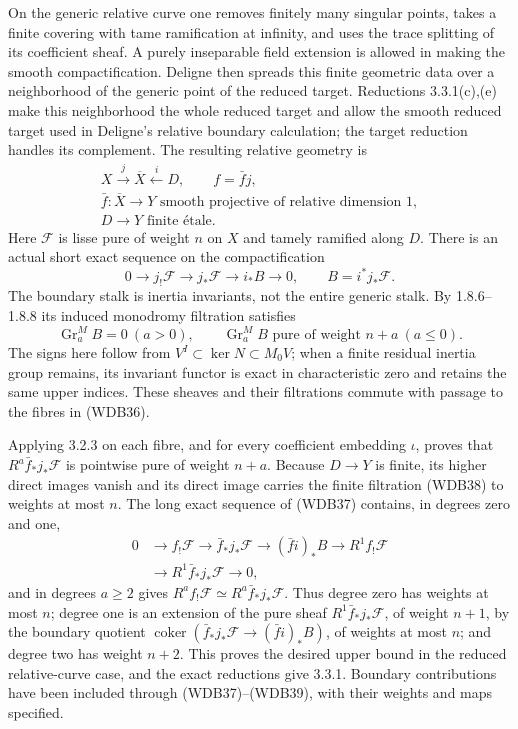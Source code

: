 On the generic relative curve one removes finitely many singular
points, takes a finite covering with tame ramification at infinity,
and uses the trace splitting of its coefficient sheaf. A purely
inseparable field extension is allowed in making the smooth
compactification. Deligne then spreads this finite geometric data
over a neighborhood of the generic point of the reduced target.
Reductions 3.3.1(c),(e) make this neighborhood the whole reduced
target and allow the smooth reduced target used in Deligne's
relative boundary calculation; the target reduction handles its
complement. The resulting
relative geometry is
\[
 \begin{gathered}
 X\xrightarrow{j}\overline X\xleftarrow{i}D,
 \qquad f=\bar f j,\\
 \bar f:\overline X\longrightarrow Y
 \text{ smooth projective of relative dimension }1,\\
 D\longrightarrow Y\text{ finite \'etale}.
 \end{gathered}
 \tag{WDB36}
\]
Here \(\mathcal F\) is lisse pure of weight \(n\) on \(X\)
and tamely ramified along \(D\). There is an actual short exact
sequence on the compactification
\[
 0\to j_!\mathcal F\to j_*\mathcal F
   \to i_*B\to0,
 \qquad B=i^*j_*\mathcal F.
 \tag{WDB37}
\]
The boundary stalk is inertia invariants, not the entire generic
stalk. By 1.8.6--1.8.8 its induced monodromy filtration satisfies
\[
 \operatorname{Gr}_a^M B=0\ (a>0),
 \qquad \operatorname{Gr}_a^M B
     \text{ pure of weight }n+a\ (a\le0).
 \tag{WDB38}
\]
The signs here follow from \(V^I\subset\ker N\subset M_0V\);
when a finite residual inertia group remains, its invariant functor
is exact in characteristic zero and retains the same upper indices.
These sheaves and their filtrations commute with passage to the
fibres in (WDB36).

Applying 3.2.3 on each fibre, and for every coefficient embedding
\(\iota\), proves that \(R^a\bar f_*j_*\mathcal F\) is
pointwise pure of weight \(n+a\). Because \(D\to Y\) is finite,
its higher direct images vanish and its direct image carries the
finite filtration (WDB38) to weights at most \(n\). The long exact
sequence of (WDB37) contains, in degrees zero and one,
\[
 \begin{split}
 0&\to f_!\mathcal F\to\bar f_*j_*\mathcal F
   \to(\bar f i)_*B\to R^1f_!\mathcal F\\
  &\to R^1\bar f_*j_*\mathcal F\to0,
 \end{split}
 \tag{WDB39}
\]
and in degrees \(a\ge2\) gives
\(R^af_!\mathcal F\simeq R^a\bar f_*j_*\mathcal F\).
Thus degree zero has weights at most \(n\); degree one is an
extension of the pure sheaf \(R^1\bar f_*j_*\mathcal F\), of
weight \(n+1\), by the boundary quotient
\(\operatorname{coker}(\bar f_*j_*\mathcal F\to(\bar f i)_*B)\),
of weights at most \(n\); and degree two has weight \(n+2\).
This proves the desired upper bound in the reduced
relative-curve case, and the exact reductions give 3.3.1. Boundary
contributions have been included through (WDB37)--(WDB39), with
their weights and maps specified.


